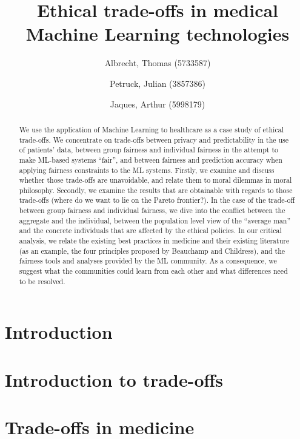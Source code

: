 \documentclass[11pt,english]{article}
\title{Ethical trade-offs in medical Machine Learning technologies}
\author{
    Albrecht, Thomas (5733587)
    \and
    Petruck, Julian (3857386)
    \and
    Jaques, Arthur (5998179)}
\newcommand{\idea}[1]{\color{blue}{#1}\color{black}}
\begin{document}

\maketitle

\begin{abstract}
	\idea{To change!}
	We use the application of Machine Learning to healthcare as a case study of ethical trade-offs.
	We concentrate on trade-offs between privacy and predictability in the use of patients' data, between group fairness and individual fairness in the attempt to make ML-based systems ``fair'', and between fairness and prediction accuracy when applying fairness constraints to the ML systems.
	Firstly, we examine and discuss whether those trade-offs are unavoidable, and relate them to moral dilemmas in moral philosophy.
	Secondly, we examine the results that are obtainable with regards to those trade-offs (where do we want to lie on the Pareto frontier?).
	In the case of the trade-off between group fairness and individual fairness, we dive into the conflict between the aggregate and the individual, between the population level view of the ``average man'' and the concrete individuals that are affected by the ethical policies.
	In our critical analysis, we relate the existing best practices in medicine and their existing literature (as an example, the four principles proposed by Beauchamp and Childress), and the fairness tools and analyses provided by the ML community.
	As a consequence, we suggest what the communities could learn from each other and what differences need to be resolved.
\end{abstract}


\clearpage
\setcounter{tocdepth}{2}
\tableofcontents
\clearpage


\section{Introduction}
\label{introduction}


\section{Introduction to trade-offs}
\label{tradeoff}


\section{Trade-offs in medicine}
\label{medicine}

\end{document}
